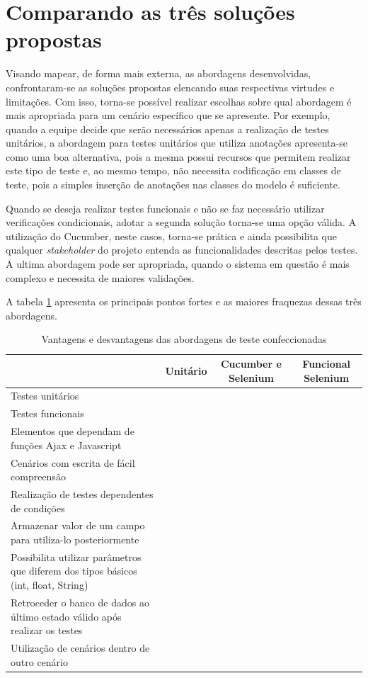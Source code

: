 \documentclass[tg]{mdtufsm}
\begin{document}
\section{Comparando as três soluções propostas}
Visando mapear, de forma mais externa, as abordagens desenvolvidas, confrontaram-se as soluções propostas elencando suas respectivas virtudes e limitações. Com isso, torna-se possível realizar escolhas sobre qual abordagem é mais apropriada para um cenário específico que se apresente.
Por exemplo, quando a equipe decide que serão necessários apenas a realização de testes unitários, a abordagem para testes unitários que utiliza anotações apresenta-se como uma boa alternativa, pois a mesma possui recursos que permitem realizar este tipo de teste e, ao mesmo tempo, não necessita codificação em classes de teste, pois a simples inserção de anotações nas classes do modelo é suficiente.

Quando se deseja realizar testes funcionais e não se faz necessário utilizar verificações condicionais, adotar a segunda solução torna-se uma opção válida. A utilização do Cucumber, neste casos, torna-se prática e ainda possibilita que qualquer \emph{stakeholder} do projeto entenda as funcionalidades descritas pelos testes.
A ultima abordagem pode ser apropriada, quando o sistema em questão é mais complexo e necessita de maiores validações.

A tabela \ref{tab:comparacaoSolucoes} apresenta os principais pontos fortes e as maiores fraquezas dessas três abordagens.

\begin{table}[!htpb]
	\centering
	\begin{tabular}{p{5cm}|c|c|c}
		& Unitário & Cucumber e Selenium & Funcional Selenium\\ \hline
		Testes unitários & \checkmark & \checkmark & \checkmark \\ \hline
		Testes funcionais &  & \checkmark & \checkmark \\ \hline
		Elementos que dependam de funções Ajax e Javascript & & \checkmark & \checkmark \\ \hline
		Cenários com escrita de fácil compreensão & & \checkmark & \\ \hline
		Realização de testes dependentes de condições & & & \checkmark \\ \hline
		Armazenar valor de um campo para utiliza-lo posteriormente & & & \checkmark \\ \hline
		Possibilita utilizar parâmetros que diferem dos tipos básicos (int, float, String) & \checkmark & & \checkmark \\ \hline
		Retroceder o banco de dados ao último estado válido após realizar os testes & & & \\ \hline
		Utilização de cenários dentro de outro cenário & & & \checkmark \\ \hline
	\end{tabular}
	\caption{Vantagens e desvantagens das abordagens de teste confeccionadas}
	\label{tab:comparacaoSolucoes}
\end{table}
\end{document}
